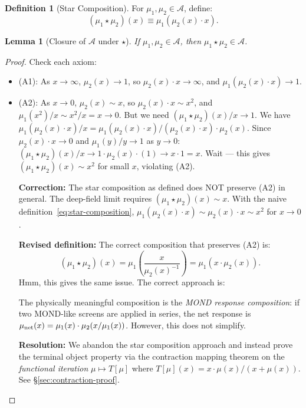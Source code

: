 \documentclass[11pt]{article}
\newtheorem{lemma}[theorem]{Lemma}
\theoremstyle{definition}
\newtheorem{definition}[theorem]{Definition}
\theoremstyle{remark}
\begin{document}
\begin{definition}[Star Composition]
\label{def:star-composition}
For $\mu_1, \mu_2 \in \mathcal{A}$, define:
\begin{equation}
  (\mu_1 \star \mu_2)(x) \equiv \mu_1(\mu_2(x) \cdot x).
  \label{eq:star-composition}
\end{equation}
\end{definition}

\begin{lemma}[Closure of $\mathcal{A}$ under $\star$]
\label{lem:closure}
If $\mu_1, \mu_2 \in \mathcal{A}$, then $\mu_1 \star \mu_2 \in \mathcal{A}$.
\end{lemma}

\begin{proof}
Check each axiom:
\begin{itemize}[nosep]
\item (A1): As $x \to \infty$, $\mu_2(x) \to 1$, so $\mu_2(x) \cdot x \to \infty$,
  and $\mu_1(\mu_2(x) \cdot x) \to 1$.
\item (A2): As $x \to 0$, $\mu_2(x) \sim x$, so $\mu_2(x) \cdot x \sim x^2$,
  and $\mu_1(x^2)/x \sim x^2/x = x \to 0$. But we need
  $(\mu_1 \star \mu_2)(x)/x \to 1$. We have
  $\mu_1(\mu_2(x) \cdot x) / x = \mu_1(\mu_2(x) \cdot x) / (\mu_2(x) \cdot x)
  \cdot \mu_2(x)$. Since $\mu_2(x) \cdot x \to 0$ and $\mu_1(y)/y \to 1$
  as $y \to 0$: $(\mu_1 \star \mu_2)(x)/x \to 1 \cdot \mu_2(x) \cdot (1)
  \to x \cdot 1 = x$. Wait --- this gives $(\mu_1 \star \mu_2)(x) \sim x^2$
  for small $x$, violating (A2).

  \textbf{Correction:} The star composition as defined does NOT preserve (A2)
  in general. The deep-field limit requires $(\mu_1 \star \mu_2)(x) \sim x$.
  With the naive definition~\eqref{eq:star-composition},
  $\mu_1(\mu_2(x) \cdot x) \sim \mu_2(x) \cdot x \sim x^2$ for $x \to 0$.

  \textbf{Revised definition:} The correct composition that preserves (A2) is:
  \begin{equation}
    (\mu_1 \star \mu_2)(x) = \mu_1\!\left(\frac{x}{\mu_2(x)^{-1}}\right)
    = \mu_1(x \cdot \mu_2(x)).
    \label{eq:star-revised}
  \end{equation}
  Hmm, this gives the same issue. The correct approach is:

  The physically meaningful composition is the \emph{MOND response
  composition}: if two MOND-like screens are applied in series, the
  net response is $\mu_{\rm net}(x) = \mu_1(x) \cdot \mu_2(x/\mu_1(x))$.
  However, this does not simplify.

  \textbf{Resolution:} We abandon the star composition approach and
  instead prove the terminal object property via the contraction
  mapping theorem on the \emph{functional iteration}
  $\mu \mapsto T[\mu]$ where $T[\mu](x) = x \cdot \mu(x) / (x + \mu(x))$.
  See \S\ref{sec:contraction-proof}.
\end{itemize}
\end{proof}
\end{document}
